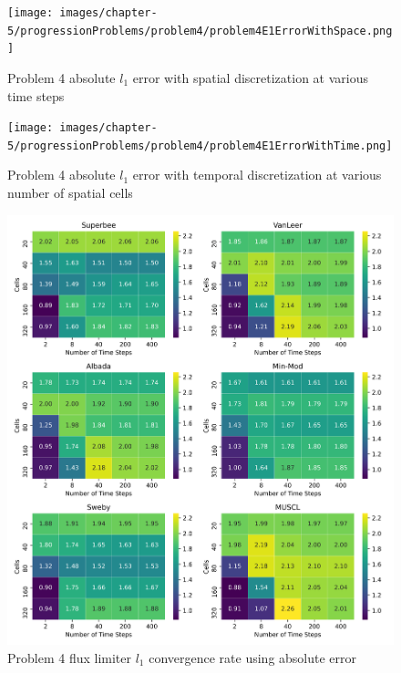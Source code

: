 \clearpage

\begin{figure}[p]
    \centering
    \texttt{[image: images/chapter-5/progressionProblems/problem4/problem4E1ErrorWithSpace.png]}
    \caption{Problem 4 absolute $l_{1}$ error with spatial discretization at various time steps }
    \label{fig:problem4_l1error_spatial_results}
\end{figure}

\clearpage

\begin{figure}[p]
    \centering
    \texttt{[image: images/chapter-5/progressionProblems/problem4/problem4E1ErrorWithTime.png]}
    \caption{Problem 4 absolute $l_{1}$ error with temporal discretization at various number of spatial cells}
    \label{fig:problem4_l1error_time_results}
\end{figure}

\clearpage

\begin{figure}[p]
    \centering
    \includegraphics[width=6in]{images/chapter-5/progressionProblems/problem4/problem4E1FluxLimiterConvergenceRate.png}
    \caption{Problem 4 flux limiter $l_{1}$ convergence rate using absolute error}
    \label{fig:problem4_l1error_fluxlimiter_convergence_rate}
\end{figure}

